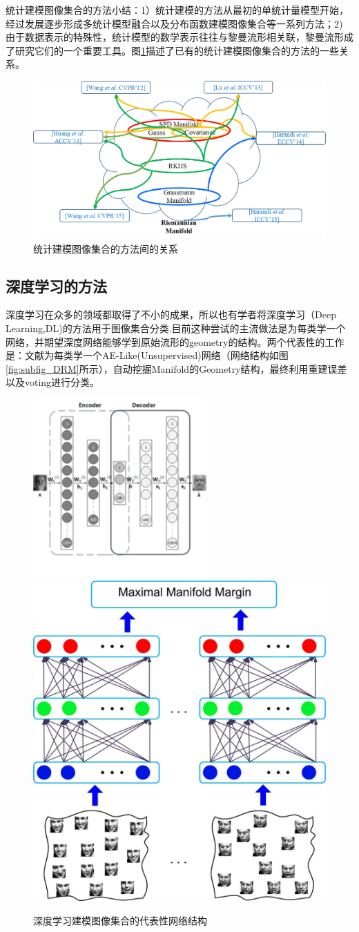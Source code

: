 统计建模图像集合的方法小结：1）统计建模的方法从最初的单统计量模型开始，经过发展逐步形成多统计模型融合以及分布函数建模图像集合等一系列方法；2) 由于数据表示的特殊性，统计模型的数学表示往往与黎曼流形相关联，黎曼流形成了研究它们的一个重要工具。图\ref{fig:Statistics_relation}描述了已有的统计建模图像集合的方法的一些关系。
\begin{figure}[h]
	\centering
	\includegraphics[width=0.7\linewidth]{source/Statistics_relation.png}
	\caption{统计建模图像集合的方法间的关系}
	\label{fig:Statistics_relation}
\end{figure}
\subsection{深度学习的方法}
\label{sec:current_Deeplearning}
深度学习在众多的领域都取得了不小的成果，所以也有学者将深度学习（Deep Learning,DL)的方法用于图像集合分类.目前这种尝试的主流做法是为每类学一个网络，并期望深度网络能够学到原始流形的geometry的结构。两个代表性的工作是：文献\cite{Deeplearning_DRM}为每类学一个AE-Like(Unsupervised)网络（网络结构如图\ref{fig:subfig_DRM}所示），自动挖掘Manifold的Geometry结构，最终利用重建误差以及voting进行分类。
\begin{figure}[h]
  \centering
      {\includegraphics[width=0.3\linewidth]{source/Deeplearning_DRM.png}}
  \hspace{4em}%
      {\includegraphics[width=0.3\linewidth]{source/Deeplearning_MMDML.png}}
  \caption{深度学习建模图像集合的代表性网络结构}
  \label{fig:Deepleaning_Nets}
\end{figure}

